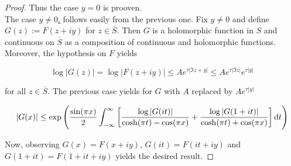 \begin{proof}
Thus the case $y = 0$ is prooven.\\
The case \underline{$y \neq 0$.} follows easily from the previous one. Fix $y \neq 0$ and define $G(z) := F(z + iy)$ for $z \in \overline{S}$. Then $G$ is a holomorphic function in $S$ and continuous on $\overline{S}$ as a composition of continuous and holomorphic functions. Moreover, the hypothesis on $F$ yields

		\begin{equation}
			\log \vert G(z) \vert = \log \vert F(z + iy) \vert \leq Ae^{\tau \vert \Im z + y\vert} \leq Ae^{\tau \vert \Im z \vert}e^{\tau \vert y \vert}
		\end{equation}

		for all $z \in \overline{S}$. The previous case yields for $G$ with $A$ replaced by $Ae^{\tau\vert y \vert}$

		\begin{equation}
			\vert G(x) \vert \leq \exp\left( \frac{\sin(\pi x)}{2} \int_{-\infty}^\infty \left[ \frac{\log \vert G(it)\vert}{\cosh(\pi t) - \cos(\pi x)} + \frac{\log \vert G(1 + it)\vert}{\cosh(\pi t) + \cos(\pi x)} \right] \mathop{}\!\mathrm{d} t\right)
		\end{equation}

		Now, observing $G(x) = F(x + iy)$, $G(it) = F(it + iy)$ and $G(1 + it) = F(1 + it + iy)$ yields the desired result.
\end{proof}

